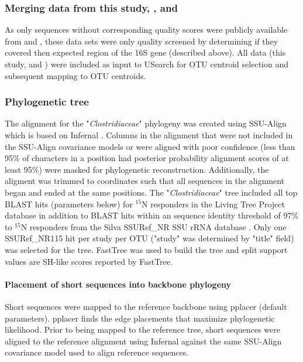 \subsubsection{Merging data from this study, \citet{Garcia_Pichel_2013}, and \citet{Steven_2013}}
As only sequences without corresponding quality scores were publicly available from \citet{Garcia_Pichel_2013} and \citet{Steven_2013}, these data sets were only quality screened by determining if they covered then expected region of the 16S gene (described above). All data (this study, \citet{Garcia_Pichel_2013} and \citet{Steven_2013}) were included as input to USearch for OTU centroid selection and subsequent mapping to OTU centroids. 

\subsubsection{Phylogenetic tree}
The alignment for the "\textit{Clostridiaceae}" phylogeny was created using SSU-Align which is based on Infernal \citep{24008419, 19307242}. Columns in the alignment that were not included in the SSU-Align covariance models or were aligned with poor confidence (less than 95\% of characters in a position had posterior probability alignment scores of at least 95\%) were masked for phylogenetic reconstruction. Additionally, the aligment was trimmed to coordinates such that all sequences in the alignment began and ended at the same positions. The "\textit{Clostridiaceae}" tree included all top BLAST hits (parameters below) for $^{15}$N responders in the Living Tree Project database \citep{Yarza_2008} in addition to BLAST hits within an sequence identity threshold of 97\% to $^{15}$N responders from the Silva SSURef\_NR SSU rRNA database \citep{17947321}. Only one SSURef\_NR115 hit per study per OTU ("study" was determined by "title" field) was selected for the tree. FastTree \citep{20224823} was used to build the tree and split support values are SH-like scores reported by FastTree.

\paragraph{Placement of short sequences into backbone phylogeny}
Short sequences were mapped to the reference backbone using pplacer \citep{Matsen_2010} (default parameters). pplacer finds the edge placements that maximize phylogenetic likelihood. Prior to being mapped to the reference tree, short sequences were aligned to the reference alignment using Infernal \citep{19307242} against the same SSU-Align covariance model used to align reference sequences.

